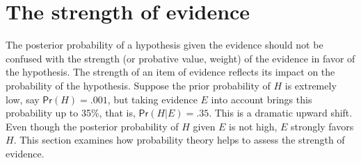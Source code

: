 \documentclass{article}
\newcommand{\pr}{\mathsf{Pr}}
\begin{document}
% 
%
%
%
%




\section{The strength of evidence}
\label{sec:LR}


The posterior probability of a hypothesis given the  evidence %
should not be confused with the strength  (or probative value, weight) of the evidence in favor of the hypothesis. 
The strength of an item of evidence reflects its impact on the probability of the hypothesis.
Suppose the prior probability of $H$ is extremely low, say $\pr(H)=.001$, but taking evidence $E$ into account brings this probability up to 35\%, that is, $\pr(H \vert E)=.35$. This is a dramatic upward shift. Even though the posterior probability of $H$ given $E$ is not high, $E$ strongly favors $H$.  %
This section examines how %
probability theory helps 
to assess the strength of evidence. 
 




\end{document}
